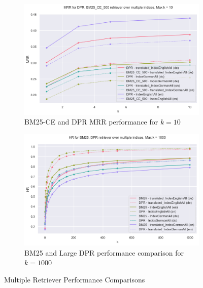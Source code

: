 \begin{figure}[h]
\begin{subfigure}{.5\textwidth}
        \includegraphics[width=\linewidth]{Grafiken/Evaluation/Data_Generation/best_retriever.png}
        \captionsetup{width=.9\linewidth}
        \caption{BM25-CE and DPR MRR performance for $k = 10$}
        \label{fig:retriever-performance-best-retriever}
    \end{subfigure}%
    \begin{subfigure}{.5\textwidth}
        \centering
        \includegraphics[width=\linewidth]{Grafiken/Evaluation/Data_Generation/BM25_DPR_1000.png}
        \captionsetup{width=.9\linewidth}
        \caption{BM25 and Large DPR performance comparison for $k = 1000$}
        \label{fig:retriever-performance-bm25-vs-dpr}
    \end{subfigure}
    \caption{Multiple Retriever Performance Comparisons}
    \label{fig:retriever-performance}
\end{figure}


